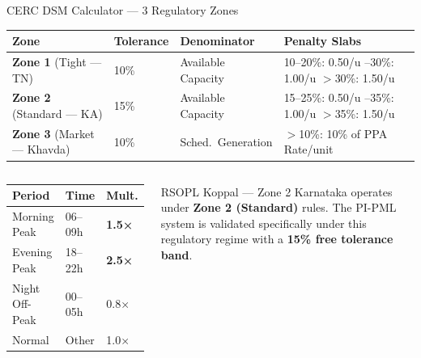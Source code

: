 \documentclass[aspectratio=169,10pt]{beamer}
\newcommand{\emphred}[1]{{\color{DSMred}\textbf{#1}}}
\newcommand{\rupee}{\textnumero}
\begin{document}
\begin{frame}{CERC DSM Calculator — 3 Regulatory Zones}
  \begin{center}
    \renewcommand{\arraystretch}{1.45}
    \small
    \begin{tabularx}{\textwidth}{@{}lXXX@{}}
      \toprule
      \textbf{Zone} & \textbf{Tolerance} & \textbf{Denominator} & \textbf{Penalty Slabs} \\
      \midrule
      \rowcolor{WindBlue!10}
      \textbf{Zone 1} \small(Tight — TN) & 10\% & Available Capacity &
        10–20\%: \rupee{}0.50/u \newline 20–30\%: \rupee{}1.00/u \newline $>$30\%: \rupee{}1.50/u \\[2pt]
      \rowcolor{MLgreen!10}
      \textbf{Zone 2} \small(Standard — KA) & 15\% & Available Capacity &
        15–25\%: \rupee{}0.50/u \newline 25–35\%: \rupee{}1.00/u \newline $>$35\%: \rupee{}1.50/u \\[2pt]
      \rowcolor{MLflow!10}
      \textbf{Zone 3} \small(Market — Khavda) & 10\% & Sched.\ Generation &
        $>$10\%: 10\% of PPA Rate/unit \\
      \bottomrule
    \end{tabularx}
  \end{center}

  \vspace{4pt}
  \begin{columns}[T]
      \begin{tcolorbox}[statbox, title={\faClock\; Dynamic ACP Multipliers}]
        \begin{tabular}{@{}lll@{}}
          \small\textbf{Period} & \small\textbf{Time} & \small\textbf{Mult.} \\
          \midrule
          \small Morning Peak  & \small 06--09h & \small\emphred{1.5×} \\
          \small Evening Peak  & \small 18--22h & \small\emphred{2.5×} \\
          \small Night Off-Peak& \small 00--05h & \small 0.8× \\
          \small Normal        & \small Other   & \small 1.0× \\
        \end{tabular}
      \end{tcolorbox}
      \begin{alertblock}{RSOPL Koppal — Zone 2}
        Karnataka operates under \emphred{Zone 2 (Standard)} rules. The PI-PML system is validated specifically under this regulatory regime with a \textbf{15\% free tolerance band}.
      \end{alertblock}
  \end{columns}
\end{frame}
\end{document}
